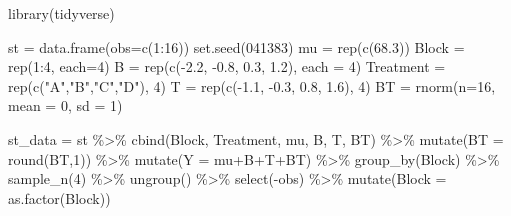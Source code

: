 \documentclass[
]{book}
\newenvironment{Shaded}{\begin{snugshade}}{\end{snugshade}}
\newcommand{\AttributeTok}[1]{\textcolor[rgb]{0.77,0.63,0.00}{#1}}
\newcommand{\DecValTok}[1]{\textcolor[rgb]{0.00,0.00,0.81}{#1}}
\newcommand{\FloatTok}[1]{\textcolor[rgb]{0.00,0.00,0.81}{#1}}
\newcommand{\FunctionTok}[1]{\textcolor[rgb]{0.00,0.00,0.00}{#1}}
\newcommand{\NormalTok}[1]{#1}
\newcommand{\OtherTok}[1]{\textcolor[rgb]{0.56,0.35,0.01}{#1}}
\newcommand{\SpecialCharTok}[1]{\textcolor[rgb]{0.00,0.00,0.00}{#1}}
\newcommand{\StringTok}[1]{\textcolor[rgb]{0.31,0.60,0.02}{#1}}
\begin{document}
\begin{Shaded}
\begin{Highlighting}[]
\FunctionTok{library}\NormalTok{(tidyverse)}

\NormalTok{st }\OtherTok{=} \FunctionTok{data.frame}\NormalTok{(}\AttributeTok{obs=}\FunctionTok{c}\NormalTok{(}\DecValTok{1}\SpecialCharTok{:}\DecValTok{16}\NormalTok{))}
\FunctionTok{set.seed}\NormalTok{(}\DecValTok{041383}\NormalTok{)}
\NormalTok{mu }\OtherTok{=} \FunctionTok{rep}\NormalTok{(}\FunctionTok{c}\NormalTok{(}\FloatTok{68.3}\NormalTok{))}
\NormalTok{Block }\OtherTok{=} \FunctionTok{rep}\NormalTok{(}\DecValTok{1}\SpecialCharTok{:}\DecValTok{4}\NormalTok{, }\AttributeTok{each=}\DecValTok{4}\NormalTok{)}
\NormalTok{B }\OtherTok{=} \FunctionTok{rep}\NormalTok{(}\FunctionTok{c}\NormalTok{(}\SpecialCharTok{{-}}\FloatTok{2.2}\NormalTok{, }\SpecialCharTok{{-}}\FloatTok{0.8}\NormalTok{, }\FloatTok{0.3}\NormalTok{, }\FloatTok{1.2}\NormalTok{), }\AttributeTok{each =} \DecValTok{4}\NormalTok{)}
\NormalTok{Treatment }\OtherTok{=} \FunctionTok{rep}\NormalTok{(}\FunctionTok{c}\NormalTok{(}\StringTok{"A"}\NormalTok{,}\StringTok{"B"}\NormalTok{,}\StringTok{"C"}\NormalTok{,}\StringTok{"D"}\NormalTok{), }\DecValTok{4}\NormalTok{)}
\NormalTok{T }\OtherTok{=} \FunctionTok{rep}\NormalTok{(}\FunctionTok{c}\NormalTok{(}\SpecialCharTok{{-}}\FloatTok{1.1}\NormalTok{, }\SpecialCharTok{{-}}\FloatTok{0.3}\NormalTok{, }\FloatTok{0.8}\NormalTok{, }\FloatTok{1.6}\NormalTok{), }\DecValTok{4}\NormalTok{)}
\NormalTok{BT }\OtherTok{=} \FunctionTok{rnorm}\NormalTok{(}\AttributeTok{n=}\DecValTok{16}\NormalTok{, }\AttributeTok{mean =} \DecValTok{0}\NormalTok{, }\AttributeTok{sd =} \DecValTok{1}\NormalTok{)}

\NormalTok{st\_data }\OtherTok{=}\NormalTok{ st }\SpecialCharTok{\%\textgreater{}\%}
  \FunctionTok{cbind}\NormalTok{(Block, Treatment, mu, B, T, BT) }\SpecialCharTok{\%\textgreater{}\%}
  \FunctionTok{mutate}\NormalTok{(}\AttributeTok{BT =} \FunctionTok{round}\NormalTok{(BT,}\DecValTok{1}\NormalTok{)) }\SpecialCharTok{\%\textgreater{}\%}
  \FunctionTok{mutate}\NormalTok{(}\AttributeTok{Y =}\NormalTok{ mu}\SpecialCharTok{+}\NormalTok{B}\SpecialCharTok{+}\NormalTok{T}\SpecialCharTok{+}\NormalTok{BT) }\SpecialCharTok{\%\textgreater{}\%}
  \FunctionTok{group\_by}\NormalTok{(Block) }\SpecialCharTok{\%\textgreater{}\%}
  \FunctionTok{sample\_n}\NormalTok{(}\DecValTok{4}\NormalTok{) }\SpecialCharTok{\%\textgreater{}\%}
  \FunctionTok{ungroup}\NormalTok{() }\SpecialCharTok{\%\textgreater{}\%}
  \FunctionTok{select}\NormalTok{(}\SpecialCharTok{{-}}\NormalTok{obs) }\SpecialCharTok{\%\textgreater{}\%}
  \FunctionTok{mutate}\NormalTok{(}\AttributeTok{Block =} \FunctionTok{as.factor}\NormalTok{(Block))}


\end{Highlighting}
\end{Shaded}
\end{document}
